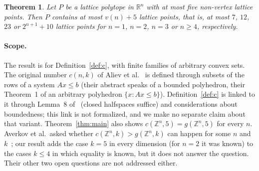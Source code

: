 \documentclass[11pt]{article}
\newtheorem{theorem}{Theorem}
\theoremstyle{definition}
\theoremstyle{remark}
\newcommand{\Z}{\mathbb Z}
\newcommand{\R}{\mathbb R}
\begin{document}
\begin{theorem}\label{thm:poly}
Let $P$ be a lattice polytope in $\R^n$ with at most five non-vertex lattice
points. Then $P$ contains at most $v(n)+5$ lattice points, that is, at most
$7$, $12$, $23$ or $2^{n+1}+10$ lattice points for $n=1$, $n=2$, $n=3$ or
$n\ge4$, respectively.
\end{theorem}

\paragraph{Scope.}
The result is for Definition~\ref{def:c}, with finite families of arbitrary
convex sets. The original number $c(n,k)$ of Aliev et al.~\cite[Theorem~1]{abdl}
is defined through subsets of the rows of a system $Ax\le b$ (their abstract
speaks of a bounded polyhedron, their Theorem~1 of an arbitrary polyhedron
$\{x:Ax\le b\}$). Definition~\ref{def:c} is linked to it through Lemma~8
of~\cite{agm} (closed halfspaces suffice) and considerations about
boundedness; this link is not formalized, and we make no separate claim about
that variant. Theorem~\ref{thm:main} also shows $c(\Z^n,5)=g(\Z^n,5)$ for every
$n$. Averkov et al.\ asked whether $c(\Z^n,k)>g(\Z^n,k)$ can happen for some
$n$ and $k$~\cite[Open question~3]{agm}; our result adds the case $k=5$ in every
dimension (for $n=2$ it was known) to the cases $k\le4$ in which equality is
known, but it does not answer the
question. Their other two open questions are not addressed either.
\end{document}
